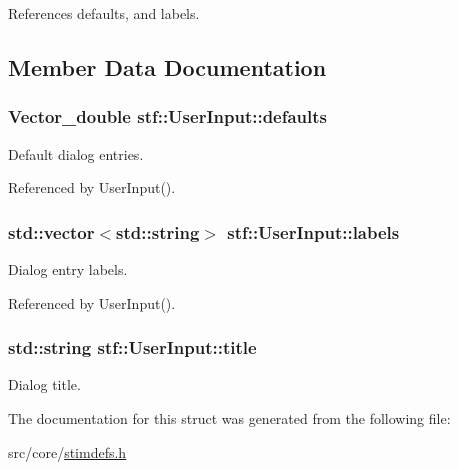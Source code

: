 References defaults, and labels.



\subsection{Member Data Documentation}
\hypertarget{structstf_1_1UserInput_a2ac332912f38c3ee90c5c18019ba49e0}{
\subsubsection[{defaults}]{\setlength{\rightskip}{0pt plus 5cm}Vector\_\-double {\bf stf::UserInput::defaults}}}
\label{structstf_1_1UserInput_a2ac332912f38c3ee90c5c18019ba49e0}
Default dialog entries. 

Referenced by UserInput().

\hypertarget{structstf_1_1UserInput_ab20fb35391b9c343150d61fe21e19461}{
\subsubsection[{labels}]{\setlength{\rightskip}{0pt plus 5cm}std::vector$<$std::string$>$ {\bf stf::UserInput::labels}}}
\label{structstf_1_1UserInput_ab20fb35391b9c343150d61fe21e19461}
Dialog entry labels. 

Referenced by UserInput().

\hypertarget{structstf_1_1UserInput_abaae883a7067175ac27205bdfdc92d3f}{
\subsubsection[{title}]{\setlength{\rightskip}{0pt plus 5cm}std::string {\bf stf::UserInput::title}}}
\label{structstf_1_1UserInput_abaae883a7067175ac27205bdfdc92d3f}
Dialog title. 

The documentation for this struct was generated from the following file:\begin{DoxyCompactItemize}
\item 
src/core/\hyperlink{stimdefs_8h}{stimdefs.h}\end{DoxyCompactItemize}
